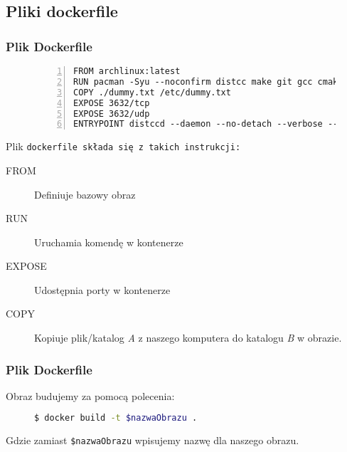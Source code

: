 \documentclass{beamer}
\begin{document}
\subsection{Pliki dockerfile}
\begin{frame}[fragile]
    \frametitle{Plik Dockerfile}

    \begin{figure}
        \begin{lstlisting}[frame=L,basicstyle=\tiny\ttfamily,numbers=left,
        morekeywords={FROM,RUN,EXPOSE,ENTRYPOINT}]
FROM archlinux:latest
RUN pacman -Syu --noconfirm distcc make git gcc cmake
COPY ./dummy.txt /etc/dummy.txt
EXPOSE 3632/tcp
EXPOSE 3632/udp
ENTRYPOINT distccd --daemon --no-detach --verbose --allow-private
    \end{lstlisting}
    \end{figure}
    Plik \texttt{dockerfile składa się z takich instrukcji:}
    \pause
    \begin{description}
        \item[FROM] Definiuje bazowy obraz
    \pause
        \item[RUN] Uruchamia komendę w kontenerze
    \pause
        \item[EXPOSE] Udostępnia porty w kontenerze
    \pause
        \item[COPY] Kopiuje plik/katalog \emph{A} z naszego komputera do katalogu \emph{B} w obrazie.
    \end{description}
\end{frame}
\begin{frame}[fragile]
    \frametitle{Plik Dockerfile}
    Obraz budujemy za pomocą polecenia:

    \begin{figure}[H]
        \begin{lstlisting}[frame=single,basicstyle=\footnotesize\ttfamily,language=bash,morekeywords={docker}]
$ docker build -t $nazwaObrazu .
    \end{lstlisting}
    \end{figure}

    Gdzie zamiast \texttt{\$nazwaObrazu} wpisujemy nazwę dla naszego obrazu.
\end{frame}
\end{document}
